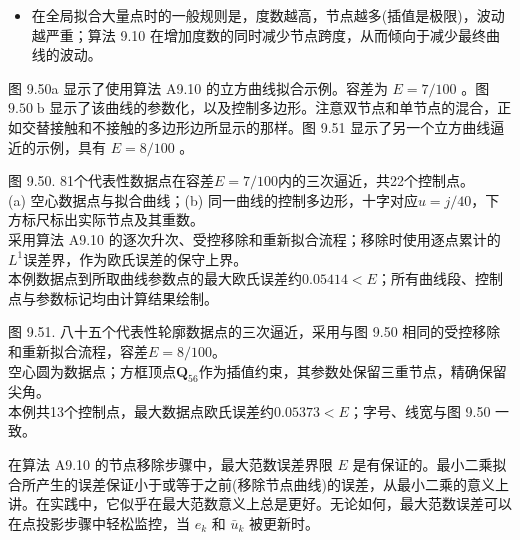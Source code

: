 \documentclass[../main.tex]{subfiles}
\begin{document}
\begin{itemize}
\item 在全局拟合大量点时的一般规则是，度数越高，节点越多(插值是极限)，波动越严重；算法 9.10 在增加度数的同时减少节点跨度，从而倾向于减少最终曲线的波动。
\end{itemize}

图 9.50a 显示了使用算法 A9.10 的立方曲线拟合示例。容差为 \(E = 7/{100}\) 。图 \({9.50}\mathrm{\;b}\) 显示了该曲线的参数化，以及控制多边形。注意双节点和单节点的混合，正如交替接触和不接触的多边形边所显示的那样。图 9.51 显示了另一个立方曲线逼近的示例，具有 \(E = 8/{100}\) 。

\begin{center}
\begin{minipage}{25cm}
\vspace*{.6\baselineskip}
\centering
{}
\par\smallskip
图 9.50. 81个代表性数据点在容差$E=7/100$内的三次逼近，共22个控制点。\\
(a) 空心数据点与拟合曲线；(b) 同一曲线的控制多边形，十字对应$u=j/40$，下方标尺标出实际节点及其重数。\\
采用算法 A9.10 的逐次升次、受控移除和重新拟合流程；移除时使用逐点累计的$L^1$误差界，作为欧氏误差的保守上界。\\
本例数据点到所取曲线参数点的最大欧氏误差约$0.05414<E$；所有曲线段、控制点与参数标记均由计算结果绘制。
\end{minipage}
\end{center}

\begin{center}
\begin{minipage}{31cm}
\vspace*{.6\baselineskip}
\centering
{}
\par\smallskip
图 9.51. 八十五个代表性轮廓数据点的三次逼近，采用与图 9.50 相同的受控移除和重新拟合流程，容差$E=8/100$。\\
空心圆为数据点；方框顶点$\mathbf Q_{56}$作为插值约束，其参数处保留三重节点，精确保留尖角。\\
本例共13个控制点，最大数据点欧氏误差约$0.05373<E$；字号、线宽与图 9.50 一致。
\end{minipage}
\end{center}

在算法 A9.10 的节点移除步骤中，最大范数误差界限 \(E\) 是有保证的。最小二乘拟合所产生的误差保证小于或等于之前(移除节点曲线)的误差，从最小二乘的意义上讲。在实践中，它似乎在最大范数意义上总是更好。无论如何，最大范数误差可以在点投影步骤中轻松监控，当 \({e}_{k}\) 和 \({\bar{u}}_{k}\) 被更新时。
\end{document}
